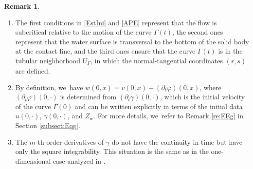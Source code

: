 \documentclass[JEP,XML,SOM,Unicode,NoFloatCountersInSection,published]{cedram}
\newenvironment{enumeratei}
{\bgroup\def\theenumi{\roman{enumi}}\def\theenumii{\arabic{enumii}}\begin{enumerate}}
{\end{enumerate}\egroup}
\newcommand{\dt}{\partial_t}
\newcommand{\ul}[1]{\underline{#1}}
\newcommand{\itGamma}{\mathit{\Gamma}}
\theoremstyle{definition}
\newtheorem{remark}[theorem]{Remark}
\begin{document}
\skpt
\begin{remark}\label{re:th}
\begin{enumeratei}
\item
The first conditions in \eqref{EstIni} and \eqref{APE} represent that the flow is subcritical relative to the motion of the curve $\itGamma(t)$,
the second ones represent that the water surface is transversal to the bottom of the solid body at the contact line,
and the third ones ensure that the curve $\itGamma(t)$ is in the tubular neighborhood $U_{\ul{\itGamma}}$,
in which the normal-tangential coordinates $(r,s)$ are defined.

\item
By definition, we~have $w(0,x)=v(0,x)-(\dt\varphi)(0,x)$, where $(\dt\varphi)(0,\cdot)$ is determined from $(\dt\gamma)(0,\cdot)$,
which is the initial velocity of the curve $\itGamma(0)$ and can be written explicitly in terms of the initial data
$u(0,\cdot)$, $\gamma(0,\cdot)$, and $Z_\mathrm{w}$.
For more details, we~refer to Remark \ref{re:EEg} in Section \ref{subsect:Eqg}.

\item
The $m$-th order derivatives of $\gamma$ do not have the continuity in time but have only the square integrability.
This situation is the same as in the one-dimensional case analyzed in \cite{IguchiLannes2021}.
\end{enumeratei}
\end{remark}
\end{document}
